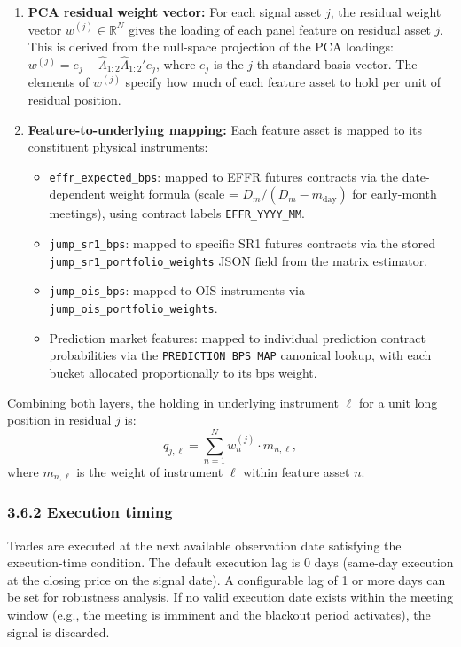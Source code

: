 \begin{enumerate}
    \item \textbf{PCA residual weight vector:} For each signal asset $j$, the residual weight vector $w^{(j)} \in \mathbb{R}^N$ gives the loading of each panel feature on residual asset $j$. This is derived from the null-space projection of the PCA loadings: $w^{(j)} = e_j - \hat{\Lambda}_{1:2} \hat{\Lambda}_{1:2}' e_j$, where $e_j$ is the $j$-th standard basis vector. The elements of $w^{(j)}$ specify how much of each feature asset to hold per unit of residual position.
    
    \item \textbf{Feature-to-underlying mapping:} Each feature asset is mapped to its constituent physical instruments:
    \begin{itemize}
        \item \texttt{effr\_expected\_bps}: mapped to EFFR futures contracts via the date-dependent weight formula (scale = $D_m/(D_m - m_\text{day})$ for early-month meetings), using contract labels \texttt{EFFR\_YYYY\_MM}.
        \item \texttt{jump\_sr1\_bps}: mapped to specific SR1 futures contracts via the stored \texttt{jump\_sr1\_portfolio\_weights} JSON field from the matrix estimator.
        \item \texttt{jump\_ois\_bps}: mapped to OIS instruments via \texttt{jump\_ois\_portfolio\_weights}.
        \item Prediction market features: mapped to individual prediction contract probabilities via the \texttt{PREDICTION\_BPS\_MAP} canonical lookup, with each bucket allocated proportionally to its bps weight.
    \end{itemize}
\end{enumerate}

Combining both layers, the holding in underlying instrument $\ell$ for a unit long position in residual $j$ is:
\[
q_{j,\ell} = \sum_{n=1}^{N} w^{(j)}_n \cdot m_{n,\ell},
\]
where $m_{n,\ell}$ is the weight of instrument $\ell$ within feature asset $n$.

\subsubsection*{3.6.2 Execution timing}

Trades are executed at the next available observation date satisfying the execution-time condition. The default execution lag is 0 days (same-day execution at the closing price on the signal date). A configurable lag of 1 or more days can be set for robustness analysis. If no valid execution date exists within the meeting window (e.g., the meeting is imminent and the blackout period activates), the signal is discarded.

